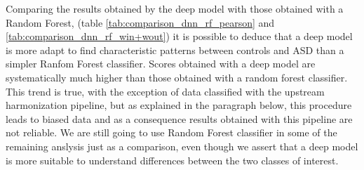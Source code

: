 \documentclass[11pt]{report}
\begin{document}
Comparing the results obtained by the deep model with those obtained with a Random Forest, (table \ref{tab:comparison_dnn_rf_pearson} and \ref{tab:comparison_dnn_rf_win+wout}) it is possible to deduce that a deep model is more adapt to find characteristic patterns between controls and ASD than a simpler Ranfom Forest classifier.
Scores obtained with a deep model are systematically much higher than those obtained with a random forest classifier.
This trend is true, with the exception of data classified with the upstream harmonization pipeline, but as explained in the paragraph below, this procedure leads to biased data and as a consequence results obtained with this pipeline are not reliable.
We are still going to use Random Forest classifier in some of the remaining anslysis just as a comparison, even though we assert that a deep model is more suitable to understand differences between the two classes of interest.
\end{document}
